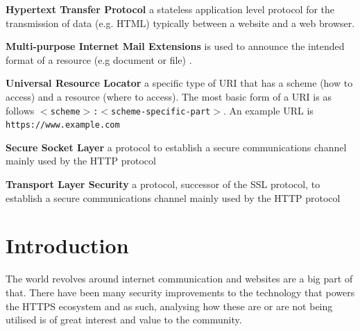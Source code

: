 \documentclass{mscreport}
\begin{document}
\begin{hangparas}{.25in}{1}
\textbf{Hypertext Transfer Protocol} a stateless application level protocol \cite{Berners-Lee1996-ji} for the transmission of data (e.g. HTML) typically between a website and a web browser. \par
\vspace{0.5cm}
\textbf{Multi-purpose Internet Mail Extensions} is used to announce the intended format of a resource (e.g document or file) \cite{Freed2013-yn}. \par
\vspace{0.5cm}
\textbf{Universal Resource Locator} a specific type of URI that has a scheme (how to access) and a resource (where to access). The most basic form of a URI is as follows \texttt{$<$scheme$>$:$<$scheme-specific-part$>$}. An example URL is \newline \texttt{https://www.example.com} \par
\vspace{0.5cm}
\textbf{Secure Socket Layer} a protocol to establish a secure communications channel mainly used by the HTTP protocol \par
\vspace{0.5cm}
\textbf{Transport Layer Security} a protocol, successor of the SSL protocol, to establish a secure communications channel mainly used by the HTTP protocol \par

\end{hangparas}
\clearpage
\newpage

\listoffigures

\clearpage
\newpage
{}
\listoftables

\clearpage
\newpage





\tableofcontents

\newpage
{}
\section*{Introduction}
\label{section:intro}


\noindent
The world revolves around internet communication and websites are a big part of that. There have been many security improvements to the technology that powers the HTTPS ecosystem and as such, analysing how these are or are not being utilised is of great interest and value to the community.
\end{document}
